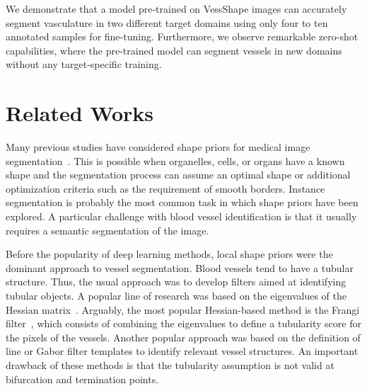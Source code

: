 \documentclass[%
reprint,
nofootinbib,
 amsmath,amssymb,
aps,
superscriptaddress,
showkeys,
longbibliography
]{revtex4-1}
\begin{document}
We demonstrate that a model pre-trained on VessShape images can accurately segment vasculature in two different target domains using only four to ten annotated samples for fine-tuning. Furthermore, we observe remarkable zero-shot capabilities, where the pre-trained model can segment vessels in new domains without any target-specific training.

\section{Related Works}
\label{sec:related}

Many previous studies have considered shape priors for medical image segmentation~\cite{bohlender2021survey,heimann2009statistical,cootes1995active}. This is possible when organelles, cells, or organs have a known shape and the segmentation process can assume an optimal shape or additional optimization criteria such as the requirement of smooth borders. Instance segmentation is probably the most common task in which shape priors have been explored. A particular challenge with blood vessel identification is that it usually requires a semantic segmentation of the image. 

Before the popularity of deep learning methods, local shape priors were the dominant approach to vessel segmentation. Blood vessels tend to have a tubular structure. Thus, the usual approach was to develop filters aimed at identifying tubular objects. A popular line of research was based on the eigenvalues of the Hessian matrix~\cite{fraz2012blood,sato1998three}. Arguably, the most popular Hessian-based method is the Frangi filter~\cite{frangi1998multiscale}, which consists of combining the eigenvalues to define a tubularity score for the pixels of the vessels. Another popular approach was based on the definition of line or Gabor filter templates to identify relevant vessel structures. An important drawback of these methods is that the tubularity assumption is not valid at bifurcation and termination points.
\end{document}
